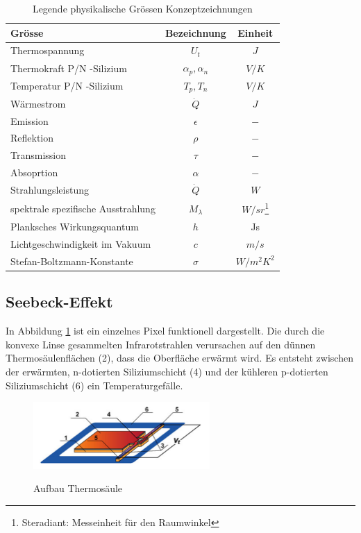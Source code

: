 \begin{table}[H]
	\centering
	\begin{tabular}{l|c|c}
		\rowcolor{gray} Grösse &  Bezeichnung  & Einheit \\
		\hline 
		Thermospannung &  $ U_{t}$ & $J$  \\ 
		\rowcolor{gray} Thermokraft P/N -Silizium  & $\alpha_{p},\alpha_{n}$ & $V/K$\\	
		Temperatur P/N -Silizium &  $T_{p},T_{n}$ & $V/K$ \\
		\rowcolor{gray}Wärmestrom &  $\dot{Q}$ & $J$  \\ 
		Emission & $\epsilon$ & $-$\\	
		\rowcolor{gray}Reflektion &  $\rho $ & $-$ \\
		Transmission & $\tau$ & $-$\\
		\rowcolor{gray}Absoprtion &  $\alpha$ & $-$  \\ 
		Strahlungsleistung & $\dot{Q}$ & $W$\\
		\rowcolor{gray}spektrale spezifische Ausstrahlung &  $M_{\lambda }$ & $W/sr$\footnote[2]{Steradiant: Messeinheit für den Raumwinkel} \\
		Planksches Wirkungsquantum &  $ h$ & Js \\ 
		\rowcolor{gray} Lichtgeschwindigkeit im Vakuum & $c $ & $ m/s$ \\ 
 		Stefan-Boltzmann-Konstante & $\sigma$ & $ W/m^2K^2 $ \\ 
	\end{tabular}
	\caption{Legende physikalische Grössen Konzeptzeichnungen}
	\label{tab:Legende Physikalische Grössen} 
\end{table} 


\subsection{Seebeck-Effekt}
\label{subsec:seebeck}
In Abbildung \ref{fig:AufbauThermo} ist ein einzelnes Pixel funktionell dargestellt. Die durch die konvexe Linse gesammelten Infrarotstrahlen verursachen auf den dünnen Thermosäulenflächen (2), dass die Oberfläche erwärmt wird. Es entsteht zwischen der erwärmten, n-dotierten Siliziumschicht (4) und der kühleren p-dotierten Siliziumschicht (6) ein Temperaturgefälle.   

\begin{figure}[H]
	\centering
	\includegraphics[width=0.6\textwidth]
	{fig/Mems_Thermopile.PNG}
	\caption[Aufbau Thermosäulenelement]{Aufbau Thermosäule} \protect\cite{AMG8834}
	\label{fig:AufbauThermo}
\end{figure}

